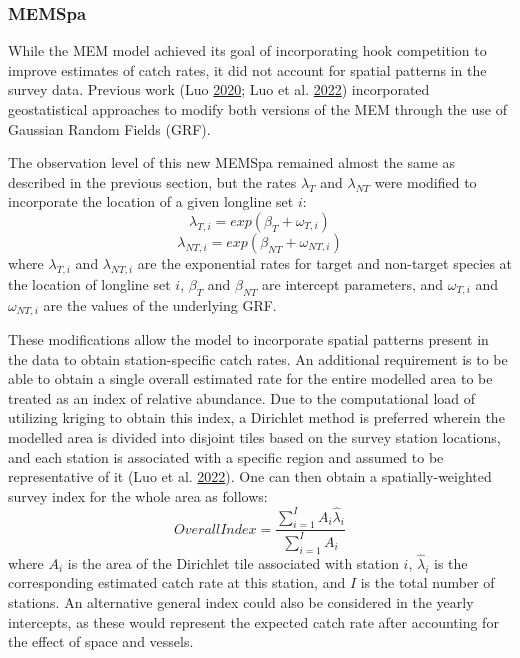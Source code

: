 \documentclass[12pt]{article}\usepackage[]{graphicx}\usepackage[]{color}
\begin{document}
\hypertarget{memspa}{%
\subsubsection{MEMSpa}\label{memspa}}

While the MEM model achieved its goal of incorporating hook competition to improve estimates of catch rates, it did not account for spatial patterns in the survey data. Previous work (Luo \protect\hyperlink{ref-Luo2020}{2020}; Luo et al. \protect\hyperlink{ref-Luo2022}{2022}) incorporated geostatistical approaches to modify both versions of the MEM through the use of Gaussian Random Fields (GRF).

The observation level of this new MEMSpa remained almost the same as described in the previous section, but the rates \(\lambda_T\) and \(\lambda_{NT}\) were modified to incorporate the location of a given longline set \(i\):
\begin{equation}
\lambda_{T,i} = exp(\beta_T+\omega_{T,i})
\end{equation} \begin{equation}
\lambda_{NT,i} = exp(\beta_{NT}+\omega_{NT,i})
\end{equation}
where \(\lambda_{T,i}\) and \(\lambda_{NT,i}\) are the exponential rates for target and non-target species at the location of longline set \(i\), \(\beta_T\) and \(\beta_{NT}\) are intercept parameters, and \(\omega_{T,i}\) and \(\omega_{NT,i}\) are the values of the underlying GRF.

These modifications allow the model to incorporate spatial patterns present in the data to obtain station-specific catch rates. An additional requirement is to be able to obtain a single overall estimated rate for the entire modelled area to be treated as an index of relative abundance. Due to the computational load of utilizing kriging to obtain this index, a Dirichlet method is preferred wherein the modelled area is divided into disjoint tiles based on the survey station locations, and each station is associated with a specific region and assumed to be representative of it (Luo et al. \protect\hyperlink{ref-Luo2022}{2022}). One can then obtain a spatially-weighted survey index for the whole area as follows:
\begin{equation}
Overall Index = \frac{\sum_{i=1}^I A_i \hat{\lambda}_i}{\sum_{i=1}^I A_i}
\end{equation}
where \(A_i\) is the area of the Dirichlet tile associated with station \(i\), \(\hat{\lambda}_i\) is the corresponding estimated catch rate at this station, and \(I\) is the total number of stations. An alternative general index could also be considered in the yearly intercepts, as these would represent the expected catch rate after accounting for the effect of space and vessels.
\end{document}
